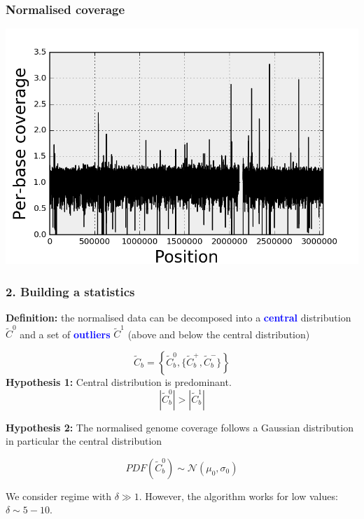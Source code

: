 \documentclass{beamer}
\begin{document}
\begin{frame}
\frametitle{Normalised coverage}
\begin{center}
\includegraphics[height=0.9\textheight, 
    width=1\textwidth]{images/coverage_normalised.png}
\end{center} 
\end{frame}


\begin{frame}
 \frametitle{2. Building a statistics}
 
\textbf{Definition:} the normalised data can be decomposed 
into a \textbf{\textcolor{blue}{central}}
distribution $\widetilde{C}^0$ and a set 
of \textbf{\textcolor{blue}{outliers}} $\widetilde{C}^1$ (above and below 
the central distribution)

\begin{equation} 
\widetilde{C}_b  = \left\{ \widetilde{C}^0_b, \{\widetilde{C}^+_b, \widetilde{C}^-_b\}  \right\}
\nonumber
\end{equation}
\vspace{1cm}
\textbf{Hypothesis 1:} Central distribution is predominant.
\begin{equation}
\left|\widetilde{C}^0_b\right| > \left|\widetilde{C}^1_b\right| \nonumber
\end{equation}
\end{frame}



\begin{frame}
\textbf{Hypothesis 2:} The normalised genome coverage follows a 
Gaussian distribution in particular the central distribution

\begin{equation}
PDF(\widetilde{C}_b^0) \sim \mathcal{N}(\mu_0, \sigma_0) \nonumber
\end{equation}

We consider regime with $\delta \gg 1$. However, the algorithm 
works for low values: $\delta \sim 5-10$.
 \end{frame}
\end{document}
